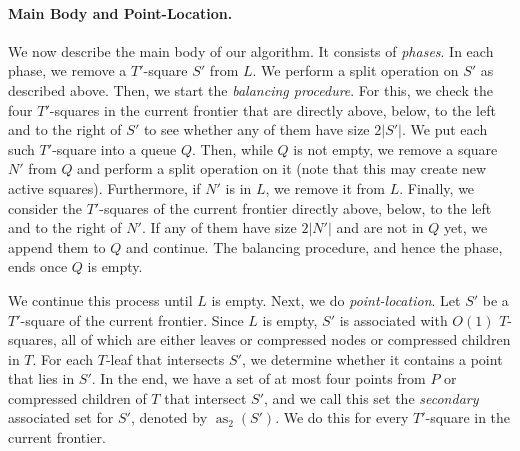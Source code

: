 \documentclass[11pt]{paper}
\DeclareMathOperator {\as}{as}
\begin{document}
    \paragraph{Main Body and Point-Location.}
      We now describe the main body of our algorithm. It consists of 
      \emph{phases}. In each phase, we remove a $T'$-square 
      $S'$ from $L$. We perform a split operation on $S'$ as
      described above. Then, we start the \emph{balancing procedure}. 
      For this, we check the four $T'$-squares in the
      current frontier that are directly above, below, to the left 
      and to the right of $S'$ to see whether any of 
      them have size $2|S'|$.
      We put each such $T'$-square into a queue $Q$. Then, while $Q$
      is not empty, we remove a square $N'$ from $Q$ and perform a
      split operation on it (note that this may create new active
      squares). Furthermore, if $N'$ is in $L$, 
      we remove it from $L$.  Finally, we consider the
      $T'$-squares of the current frontier directly above, below, to 
      the left and to the right
      of $N'$. If any of them have size $2|N'|$ and are not in $Q$ yet, we 
      append them to $Q$ and continue. The balancing procedure, and 
      hence the phase, ends once $Q$ is empty.

      We continue this process until $L$ is empty. Next, we do
       \emph{point-location}. Let $S'$ be a
      $T'$-square of the current frontier. Since $L$ is empty, 
      $S'$ is associated with $O(1)$ $T$-squares, all of 
      which are either leaves or compressed nodes or 
      compressed children in $T$. For each $T$-leaf that intersects 
      $S'$, we determine whether it contains a point that lies 
      in $S'$. In the end, we have a set of
      at most four points from $P$  or compressed children of $T$
      that intersect $S'$, and we call this set the \emph{secondary} associated
      set for $S'$, denoted by $\as_2(S')$. We do this for every $T'$-square
      in the
      current frontier. 
      
\end{document}
